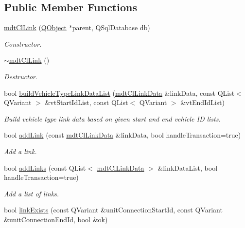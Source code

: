 \subsection*{Public Member Functions}
\begin{DoxyCompactItemize}
\item 
\hyperlink{classmdt_cl_link_a5cef1766f2f03106227227582eed0245}{mdt\-Cl\-Link} (\hyperlink{class_q_object}{Q\-Object} $\ast$parent, Q\-Sql\-Database db)
\begin{DoxyCompactList}\small\item\em Constructor. \end{DoxyCompactList}\item 
\hyperlink{classmdt_cl_link_a1fa6ad3a2ecc7c5f2851c95152a7ed94}{$\sim$mdt\-Cl\-Link} ()
\begin{DoxyCompactList}\small\item\em Destructor. \end{DoxyCompactList}\item 
bool \hyperlink{classmdt_cl_link_aaf2a931c22263b7b5a573fbaf5ae2dc5}{build\-Vehicle\-Type\-Link\-Data\-List} (\hyperlink{classmdt_cl_link_data}{mdt\-Cl\-Link\-Data} \&link\-Data, const Q\-List$<$ Q\-Variant $>$ \&vt\-Start\-Id\-List, const Q\-List$<$ Q\-Variant $>$ \&vt\-End\-Id\-List)
\begin{DoxyCompactList}\small\item\em Build vehicle type link data based on given start and end vehicle I\-D lists. \end{DoxyCompactList}\item 
bool \hyperlink{classmdt_cl_link_a65c1cc934c0f9b37434dbb44964623b1}{add\-Link} (const \hyperlink{classmdt_cl_link_data}{mdt\-Cl\-Link\-Data} \&link\-Data, bool handle\-Transaction=true)
\begin{DoxyCompactList}\small\item\em Add a link. \end{DoxyCompactList}\item 
bool \hyperlink{classmdt_cl_link_adeb5674e94942568e149d68c46caaf50}{add\-Links} (const Q\-List$<$ \hyperlink{classmdt_cl_link_data}{mdt\-Cl\-Link\-Data} $>$ \&link\-Data\-List, bool handle\-Transaction=true)
\begin{DoxyCompactList}\small\item\em Add a list of links. \end{DoxyCompactList}\item 
bool \hyperlink{classmdt_cl_link_aab07d53c8f74dc93bf4dceb0ceb03815}{link\-Exists} (const Q\-Variant \&unit\-Connection\-Start\-Id, const Q\-Variant \&unit\-Connection\-End\-Id, bool \&ok)

\end{DoxyCompactItemize}
